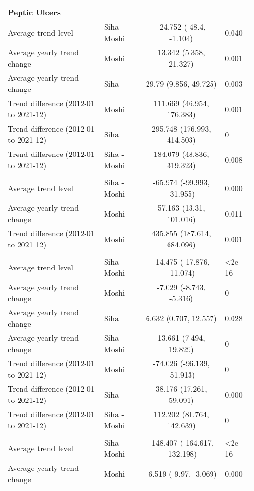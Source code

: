 \begin{longtable}{l|lcl}
\multicolumn{4}{l}{Peptic Ulcers} \\ 
\midrule\addlinespace[2.5pt]
Average trend level & Siha - Moshi & -24.752 (-48.4, -1.104) & 0.040 \\ 
Average yearly trend change & Moshi & 13.342 (5.358, 21.327) & 0.001 \\ 
Average yearly trend change & Siha & 29.79 (9.856, 49.725) & 0.003 \\ 
Trend difference (2012-01 to 2021-12) & Moshi & 111.669 (46.954, 176.383) & 0.001 \\ 
Trend difference (2012-01 to 2021-12) & Siha & 295.748 (176.993, 414.503) & 0 \\ 
Trend difference (2012-01 to 2021-12) & Siha - Moshi & 184.079 (48.836, 319.323) & 0.008 \\ 
\midrule\addlinespace[2.5pt]
\multicolumn{4}{l}{Pneumonia, Severe} \\ 
\midrule\addlinespace[2.5pt]
Average trend level & Siha - Moshi & -65.974 (-99.993, -31.955) & 0.000 \\ 
Average yearly trend change & Moshi & 57.163 (13.31, 101.016) & 0.011 \\ 
Trend difference (2012-01 to 2021-12) & Moshi & 435.855 (187.614, 684.096) & 0.001 \\ 
\midrule\addlinespace[2.5pt]
\multicolumn{4}{l}{Poisoning} \\ 
\midrule\addlinespace[2.5pt]
Average trend level & Siha - Moshi & -14.475 (-17.876, -11.074) & <2e-16 \\ 
Average yearly trend change & Moshi & -7.029 (-8.743, -5.316) & 0 \\ 
Average yearly trend change & Siha & 6.632 (0.707, 12.557) & 0.028 \\ 
Average yearly trend change & Siha - Moshi & 13.661 (7.494, 19.829) & 0 \\ 
Trend difference (2012-01 to 2021-12) & Moshi & -74.026 (-96.139, -51.913) & 0 \\ 
Trend difference (2012-01 to 2021-12) & Siha & 38.176 (17.261, 59.091) & 0.000 \\ 
Trend difference (2012-01 to 2021-12) & Siha - Moshi & 112.202 (81.764, 142.639) & 0 \\ 
\midrule\addlinespace[2.5pt]
\multicolumn{4}{l}{Psychoses} \\ 
\midrule\addlinespace[2.5pt]
Average trend level & Siha - Moshi & -148.407 (-164.617, -132.198) & <2e-16 \\ 
Average yearly trend change & Moshi & -6.519 (-9.97, -3.069) & 0.000 \\ 

\end{longtable}
